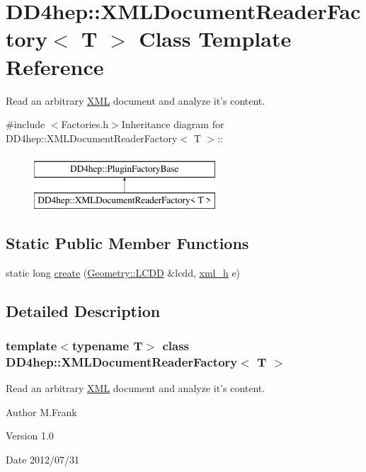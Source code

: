 \hypertarget{class_d_d4hep_1_1_x_m_l_document_reader_factory}{
\section{DD4hep::XMLDocumentReaderFactory$<$ T $>$ Class Template Reference}
\label{class_d_d4hep_1_1_x_m_l_document_reader_factory}
}


Read an arbitrary \hyperlink{namespace_d_d4hep_1_1_x_m_l}{XML} document and analyze it's content.  


{\ttfamily \#include $<$Factories.h$>$}Inheritance diagram for DD4hep::XMLDocumentReaderFactory$<$ T $>$::\begin{figure}[H]
\begin{center}
\leavevmode
\includegraphics[height=2cm]{class_d_d4hep_1_1_x_m_l_document_reader_factory}
\end{center}
\end{figure}
\subsection*{Static Public Member Functions}
\begin{DoxyCompactItemize}
\item 
static long \hyperlink{class_d_d4hep_1_1_x_m_l_document_reader_factory_aa504d333a2f40d12a83d0f2d2585938f}{create} (\hyperlink{class_d_d4hep_1_1_geometry_1_1_l_c_d_d}{Geometry::LCDD} \&lcdd, \hyperlink{class_d_d4hep_1_1_x_m_l_1_1_handle__t}{xml\_\-h} e)
\end{DoxyCompactItemize}


\subsection{Detailed Description}
\subsubsection*{template$<$typename T$>$ class DD4hep::XMLDocumentReaderFactory$<$ T $>$}

Read an arbitrary \hyperlink{namespace_d_d4hep_1_1_x_m_l}{XML} document and analyze it's content. \begin{DoxyAuthor}{Author}
M.Frank 
\end{DoxyAuthor}
\begin{DoxyVersion}{Version}
1.0 
\end{DoxyVersion}
\begin{DoxyDate}{Date}
2012/07/31 
\end{DoxyDate}


